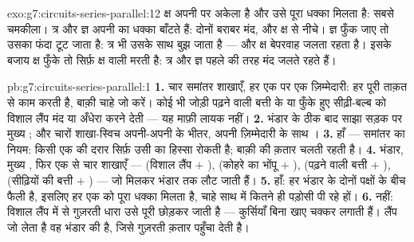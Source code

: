 \begin{solution}{exo:g7:circuits-series-parallel:12}
क्ष अपनी  पर अकेला है और उसे पूरा धक्का मिलता है: सबसे चमकीला।
त्र और ज्ञ अपनी  का धक्का  बाँटते हैं: दोनों बराबर मंद,
और क्ष से नीचे। ज्ञ फुँक जाए तो उसका फंदा टूट जाता है: त्र भी उसके साथ
बुझ जाता है --- और क्ष बेपरवाह जलता रहता है। इसके बजाय क्ष फुँके तो
सिर्फ़ क्ष वाली  मरती है: त्र और ज्ञ पहले की तरह मंद जलते रहते हैं।
\end{solution}

\begin{solution}{pb:g7:circuits-series-parallel:1}
\textbf{1.} चार समांतर शाखाएँ, हर एक पर एक ज़िम्मेदारी:  हर
 पूरी ताक़त से काम करती है, बाक़ी चाहे जो करें।  कोई भी
जोड़ी पढ़ने वाली बत्ती के  या फुँके हुए सीढ़ी-बल्ब को विशाल लैंप
मंद या अँधेरा करने देती --- यह माफ़ी लायक नहीं।
\textbf{2.} भंडार के ठीक बाद साझा सड़क पर मुख्य ; और चारों
शाखा-स्विच अपनी-अपनी  के भीतर, अपनी ज़िम्मेदारी के साथ ।
\textbf{3.} हाँ --- समांतर का नियम: किसी एक  की दरार सिर्फ़ उसी
 का हिस्सा रोकती है; बाक़ी की क़तार चलती रहती है।
\textbf{4.} भंडार, मुख्य , फिर एक  से चार शाखाएँ ---
(विशाल लैंप $+$ ), (कोहरे का भोंपू $+$ ), (पढ़ने वाली बत्ती
$+$ ), (सीढ़ियों की बत्ती $+$ ) --- जो मिलकर भंडार तक लौट
जाती हैं।
\textbf{5.} हाँ: हर  भंडार के दोनों पक्षों के बीच फैली है, इसलिए
हर एक को पूरा धक्का मिलता है, चाहे साथ में कितने ही पड़ोसी पी रहे हों।
\textbf{6.} नहीं: विशाल लैंप में से गुज़रती धारा उसे पूरी छोड़कर जाती
है --- कुर्सियाँ बिना खाए चक्कर लगाती हैं। लैंप जो लेता है वह भंडार की
 है, जिसे गुज़रती क़तार पहुँचा देती है।

\end{solution}
